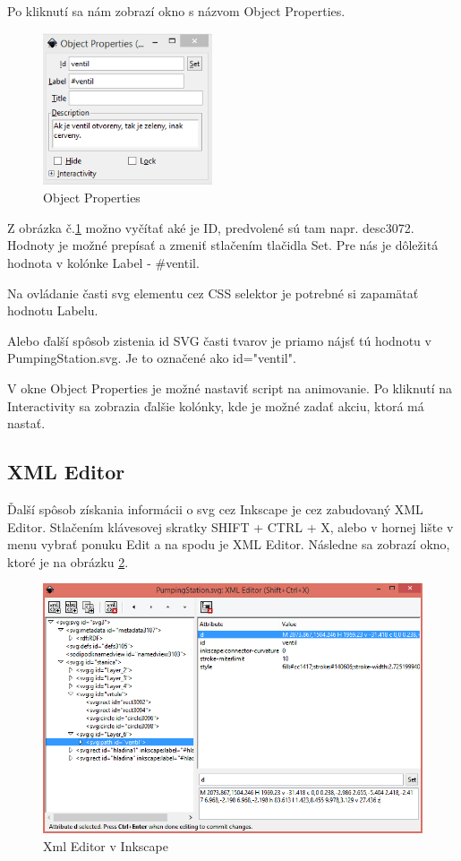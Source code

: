 Po kliknutí sa nám zobrazí okno s názvom Object Properties. 

\begin{figure}[H]
	\begin{center}
		\includegraphics [width=5cm]  {obrazky/obr3.png}
		\caption{Object Properties}
		\label{picture3}
	\end{center}
\end{figure}


Z obrázka č.\ref{picture3} možno vyčítať aké je ID, predvolené sú tam napr. desc3072. Hodnoty je možné prepísať a zmeniť stlačením tlačidla Set. Pre nás je dôležitá hodnota v kolónke Label - \#ventil. 

Na ovládanie časti svg elementu cez CSS selektor je potrebné si zapamätať hodnotu Labelu.  %

Alebo ďalší spôsob zistenia id SVG časti tvarov je priamo nájsť tú hodnotu v PumpingStation.svg. Je to označené ako id="ventil".

V okne Object Properties je možné nastaviť script na animovanie. Po kliknutí na Interactivity sa zobrazia ďalšie kolónky, kde je možné zadať akciu, ktorá má nastať.  



\subsection{XML Editor}
Ďalší spôsob získania informácii o svg cez Inkscape je cez zabudovaný XML Editor.
Stlačením klávesovej skratky SHIFT + CTRL + X, alebo v hornej lište v menu vybrať ponuku Edit a na spodu je XML Editor. Následne sa zobrazí okno, ktoré je na obrázku \ref{xmlEditor}.
\begin{figure}[H]
	\begin{center}
		\includegraphics[width=0.7\linewidth]  {obrazky/XmlEditor2.png}
		\caption{Xml Editor v Inkscape}
		\label{xmlEditor}
	\end{center}
\end{figure}


